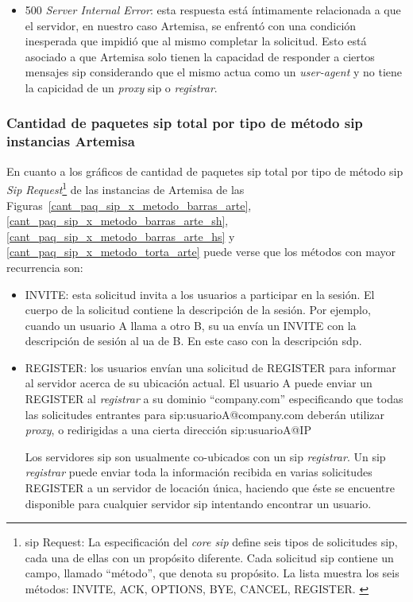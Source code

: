 \documentclass[a4paper,12pt]{report}
\begin{document}
{\begin{itemize}
\item 500 \emph{Server Internal Error}: esta respuesta está íntimamente
relacionada a que el servidor, en nuestro caso Artemisa, se enfrentó con una
condición inesperada que impidió que al mismo completar la solicitud. Esto está
asociado a que Artemisa solo tienen la capacidad de responder a ciertos
mensajes \ac{sip} considerando que el mismo actua como un \emph{user-agent} y no tiene la
capicidad de un \emph{proxy} \ac{sip} o \emph{registrar}.\\
\end{itemize}

\subsubsection{Cantidad de paquetes \ac{sip} total por tipo de método \ac{sip} instancias Artemisa}

En cuanto a los gráficos de cantidad de paquetes \ac{sip} total por tipo de
método \ac{sip} \emph{Sip Request}\footnote{\ac{sip} Request: La especificación del
\emph{core \ac{sip}} define seis tipos de solicitudes
\ac{sip}, cada una de ellas con un propósito diferente. Cada solicitud \ac{sip} contiene
un campo, llamado ``método'', que denota su propósito. La lista muestra los
seis métodos: INVITE, ACK, OPTIONS, BYE, CANCEL, REGISTER. \cite{camarillo}} de las instancias de 
Artemisa de las Figuras~\ref{cant_paq_sip_x_metodo_barras_arte}, \ref{cant_paq_sip_x_metodo_barras_arte_sh}, 
\ref{cant_paq_sip_x_metodo_barras_arte_hs} y \ref{cant_paq_sip_x_metodo_torta_arte} puede verse que
los métodos con mayor recurrencia son:

\begin{itemize}
\item INVITE: esta solicitud invita a los usuarios a participar en la sesión. El cuerpo
de la solicitud contiene la descripción de la sesión. Por ejemplo,
cuando un usuario A llama a otro B, su \ac{ua} envía un INVITE con la descripción de
sesión al \ac{ua} de B. En este caso con la descripción \ac{sdp}.

\item REGISTER:
los usuarios envían una solicitud de REGISTER para informar al servidor acerca de su ubicación actual. El
usuario A puede enviar un REGISTER al \emph{registrar} a su dominio ``company.com''
especificando que todas las solicitudes entrantes para \ac{sip}:usuarioA@company.com
deberán utilizar \emph{proxy}, o redirigidas a una cierta dirección \ac{sip}:usuarioA@IP

Los servidores \ac{sip} son usualmente co-ubicados con un \ac{sip} \emph{registrar}. Un
\ac{sip} \emph{registrar} puede enviar toda la información recibida en varias solicitudes
REGISTER a un servidor de locación única, haciendo que éste se encuentre
disponible para cualquier servidor \ac{sip} intentando encontrar un usuario. 
  

\end{itemize}}
\end{document}
